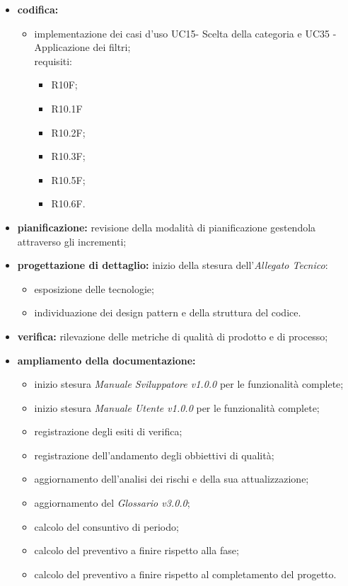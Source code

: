 \begin{itemize}
    \item \textbf{codifica:}
          \begin{itemize}
              \item implementazione dei casi d'uso UC15- Scelta della categoria e UC35 - Applicazione dei filtri;\\ requisiti:
                    \begin{itemize}
                        \item R10F;                                                                   \item R10.1F
                        \item R10.2F;
                        \item R10.3F;
                        \item R10.5F;
                        \item R10.6F.
                    \end{itemize}
          \end{itemize}
    \item \textbf{pianificazione:} revisione della modalità di pianificazione gestendola attraverso gli incrementi;
    \item \textbf{progettazione di dettaglio:} inizio della stesura dell'\textit{Allegato Tecnico}:
          \begin{itemize}
              \item esposizione delle tecnologie;
              \item individuazione dei design pattern e della struttura del codice.
          \end{itemize}
    \item \textbf{verifica:} rilevazione delle metriche di qualità di prodotto e di processo;
    \item \textbf{ampliamento della documentazione:}
          \begin{itemize}
              \item inizio stesura \textit{Manuale Sviluppatore v1.0.0} per le funzionalità complete;
              \item inizio stesura \textit{Manuale Utente v1.0.0} per le funzionalità complete;
              \item registrazione degli esiti di verifica;
              \item registrazione dell'andamento degli obbiettivi di qualità;
              \item aggiornamento dell'analisi dei rischi e della sua attualizzazione;
              \item aggiornamento del \textit{Glossario v3.0.0};
              \item calcolo del consuntivo di periodo;
              \item calcolo del preventivo a finire rispetto alla fase;
              \item calcolo del preventivo a finire rispetto al completamento del progetto.
          \end{itemize}
\end{itemize}
